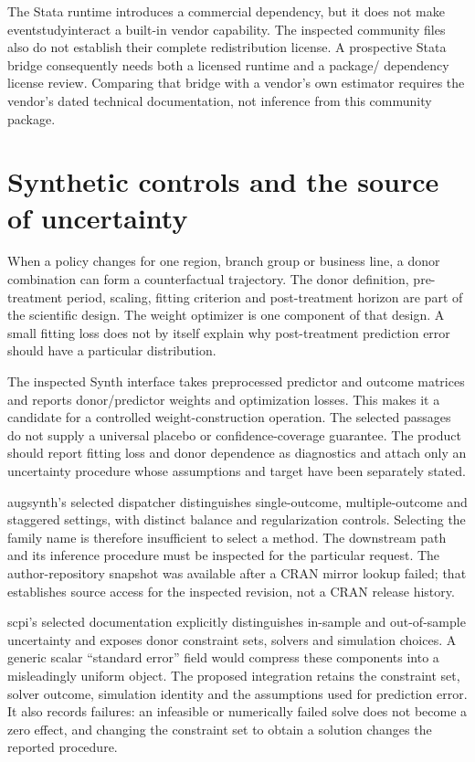 The Stata runtime introduces a commercial dependency, but it does not make
eventstudyinteract a built-in vendor capability. The inspected community files
also do not establish their complete redistribution license. A prospective
Stata bridge consequently needs both a licensed runtime and a package/
dependency license review. Comparing that bridge with a vendor's own estimator
requires the vendor's dated technical documentation, not inference from this
community package.

\section{Synthetic controls and the source of uncertainty}

When a policy changes for one region, branch group or business line, a donor
combination can form a counterfactual trajectory. The donor definition,
pre-treatment period, scaling, fitting criterion and post-treatment horizon
are part of the scientific design. The weight optimizer is one component of
that design. A small fitting loss does not by itself explain why post-treatment
prediction error should have a particular distribution.

The inspected Synth interface takes preprocessed predictor and outcome
matrices and reports donor/predictor weights and optimization losses. This
makes it a candidate for a controlled weight-construction operation. The
selected passages do not supply a universal placebo or confidence-coverage
guarantee. The product should report fitting loss and donor dependence as
diagnostics and attach only an uncertainty procedure whose assumptions and
target have been separately stated.\cite{synth}

augsynth's selected dispatcher distinguishes single-outcome, multiple-outcome
and staggered settings, with distinct balance and regularization controls.
Selecting the family name is therefore insufficient to select a method.
The downstream path and its inference procedure must be inspected for the
particular request. The author-repository snapshot was available after a CRAN
mirror lookup failed; that establishes source access for the inspected
revision, not a CRAN release history.\cite{augsynth}

scpi's selected documentation explicitly distinguishes in-sample and
out-of-sample uncertainty and exposes donor constraint sets, solvers and
simulation choices. A generic scalar ``standard error'' field would compress
these components into a misleadingly uniform object. The proposed integration
retains the constraint set, solver outcome, simulation identity and the
assumptions used for prediction error. It also records failures: an infeasible
or numerically failed solve does not become a zero effect, and changing the
constraint set to obtain a solution changes the reported procedure.
\cite{scpi}

